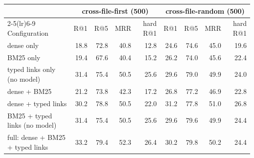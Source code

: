 \begin{tabular}{lrrrrrrrr}
\toprule
 & \multicolumn{4}{c}{cross-file-first (500)} & \multicolumn{4}{c}{cross-file-random (500)} \\
\cmidrule(lr){2-5}\cmidrule(lr){6-9}
Configuration & R@1 & R@5 & MRR & hard R@1 & R@1 & R@5 & MRR & hard R@1 \\
\midrule
dense only & 18.8 & 72.8 & 40.8 & 12.8 & 24.6 & 74.6 & 45.0 & 19.6 \\
BM25 only & 19.4 & 67.6 & 40.4 & 15.2 & 26.2 & 74.0 & 45.6 & 22.4 \\
typed links only (no model) & 31.4 & 75.4 & 50.5 & 25.6 & 29.6 & 79.0 & 49.9 & 24.0 \\
dense + BM25 & 21.2 & 73.8 & 42.3 & 17.2 & 26.8 & 77.2 & 46.9 & 22.8 \\
dense + typed links & 30.2 & 78.8 & 50.5 & 22.0 & 31.2 & 77.8 & 51.0 & 26.8 \\
BM25 + typed links (no model) & 31.4 & 75.4 & 50.5 & 25.6 & 29.6 & 79.6 & 49.9 & 24.4 \\
full: dense + BM25 + typed links & 33.2 & 79.4 & 52.3 & 26.4 & 30.2 & 79.8 & 50.2 & 24.4 \\
\bottomrule
\end{tabular}
